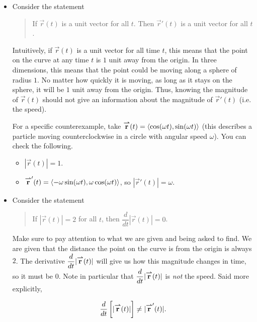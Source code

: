 \documentclass{ximera}
\begin{document}
\begin{exercise}
\begin{hint}
\begin{question}
\begin{question}
\begin{itemize}
\item Consider the statement

\begin{quote}
If $\vec{r}(t)$ is a unit vector for all $t$.  Then $\vec{r}'(t)$  is a unit vector for all $t$.
\end{quote}

Intuitively, if $\vec{r}(t)$ is a unit vector for all time $t$, this means that the point on the curve at any time $t$ is $1$ unit away from the origin.  In three dimensions, this means that the point could be moving along a sphere of radius $1$.  No matter how quickly it is moving, as long as it stays on the sphere, it will be $1$ unit away from the origin.  Thus, knowing the magnitude of $\vec{r}(t)$ should not give an information about the magnitude of $\vec{r}'(t)$ (i.e. the speed).
 
 For a specific counterexample, take ${\overset{\boldsymbol{\rightharpoonup}}{\mathbf{r}}}(t) = \left\langle \cos(\omega t),\sin(\omega t)\right\rangle$ (this describes a particle moving counterclockwise in a circle with angular speed $\omega$).  You can check the following.
 
 \begin{itemize}
 \item $|\vec{r}(t)| = 1$.
 \item ${\overset{\boldsymbol{\rightharpoonup}}{\mathbf{r}}}'(t) = \left\langle -\omega \sin(\omega t), \omega \cos(\omega t)\right\rangle$, so $|\vec{r}'(t)| = \omega$.
 \end{itemize}
\item Consider the statement

 \begin{quote}
If $|\vec{r}(t)|=2$ for all $t$, then $\dfrac{d}{dt} |\vec{r}(t) | =0$.
\end{quote}

Make sure to pay attention to what we are given and being asked to find.  We are given that the distance the point on the curve is from the origin is always $2$.  The derivative $\dfrac{\mathop{}\!d}{\mathop{}\!d t} |{\overset{\boldsymbol{\rightharpoonup}}{\mathbf{r}}}(t) |$ will give us how this magnitude changes in time, so it must be $0$.  Note in particular that $\dfrac{\mathop{}\!d}{\mathop{}\!d t} |{\overset{\boldsymbol{\rightharpoonup}}{\mathbf{r}}}(t) |$ is \emph{not} the speed.  Said more explicitly,

\[
\frac{\mathop{}\!d}{\mathop{}\!d t} \left[\vphantom{\bigg|} |{\overset{\boldsymbol{\rightharpoonup}}{\mathbf{r}}}(t)| \right] \neq |{\overset{\boldsymbol{\rightharpoonup}}{\mathbf{r}}}'(t)|.
\]
\end{itemize}

\end{question}
\end{question}
 \end{hint}
 \end{exercise}
\end{document}
